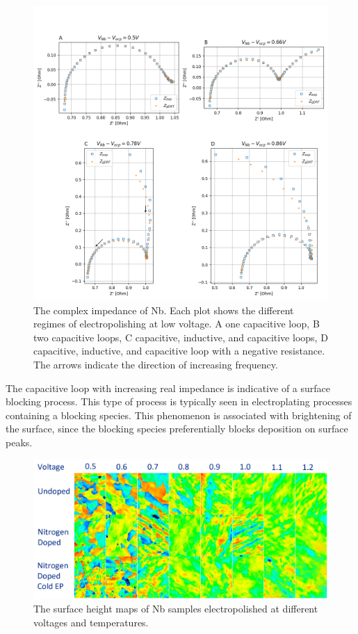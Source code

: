 \begin{figure}[t]
  
  \includegraphics[width=\textwidth]{../figures/nyquist.png}
  \caption{The complex impedance of Nb. Each plot shows the different regimes of electropolishing at low voltage. A one capacitive loop, B two capacitive loops, C capacitive, inductive, and capacitive loops, D capacitive, inductive, and capacitive loop with a negative resistance. The arrows indicate the direction of increasing frequency.}
  \label{fig:nyquistplot}
\end{figure}

The capacitive loop with increasing real impedance is indicative of a surface blocking process. This type of process is typically seen in electroplating processes containing a blocking species. This phenomenon is associated with brightening of the surface, since the blocking species preferentially blocks deposition on surface peaks.


\begin{figure}[t]
    
    \includegraphics[width=\textwidth]{../figures/surface_maps.png}
    \caption{The surface height maps of Nb samples electropolished at different voltages and temperatures.}
    \label{fig:surface_maps}
\end{figure}

